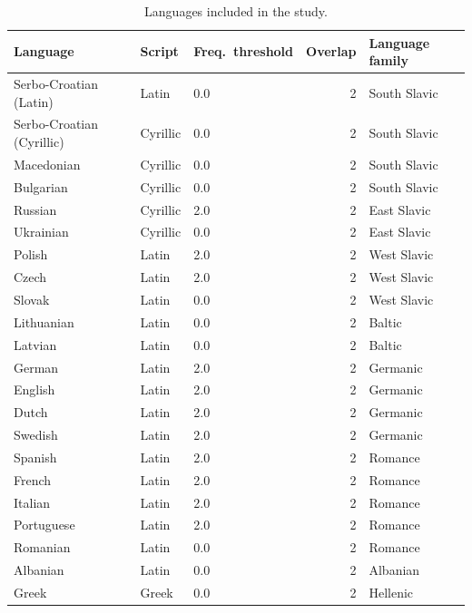 \begin{table}[H]
\centering
\caption{Languages included in the study.}
\label{tab:languages}
\begin{tabular}{lllrl}
\toprule
Language & Script & Freq.\ threshold & Overlap & Language family \\
\midrule
Serbo-Croatian (Latin)    & Latin      & 0.0 & 2 & South Slavic \\
Serbo-Croatian (Cyrillic) & Cyrillic   & 0.0 & 2 & South Slavic \\
Macedonian                & Cyrillic   & 0.0 & 2 & South Slavic \\
Bulgarian                 & Cyrillic   & 0.0 & 2 & South Slavic \\
Russian                   & Cyrillic   & 2.0 & 2 & East Slavic  \\
Ukrainian                 & Cyrillic   & 0.0 & 2 & East Slavic  \\
Polish                    & Latin      & 2.0 & 2 & West Slavic  \\
Czech                     & Latin      & 2.0 & 2 & West Slavic  \\
Slovak                    & Latin      & 0.0 & 2 & West Slavic  \\
Lithuanian                & Latin      & 0.0 & 2 & Baltic       \\
Latvian                   & Latin      & 0.0 & 2 & Baltic       \\
German                    & Latin      & 2.0 & 2 & Germanic     \\
English                   & Latin      & 2.0 & 2 & Germanic     \\
Dutch                     & Latin      & 2.0 & 2 & Germanic     \\
Swedish                   & Latin      & 2.0 & 2 & Germanic     \\
Spanish                   & Latin      & 2.0 & 2 & Romance      \\
French                    & Latin      & 2.0 & 2 & Romance      \\
Italian                   & Latin      & 2.0 & 2 & Romance      \\
Portuguese                & Latin      & 2.0 & 2 & Romance      \\
Romanian                  & Latin      & 0.0 & 2 & Romance      \\
Albanian                  & Latin      & 0.0 & 2 & Albanian     \\
Greek                     & Greek      & 0.0 & 2 & Hellenic     \\

\end{tabular}
\end{table}
